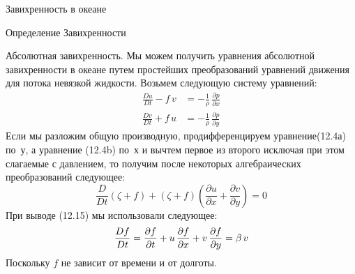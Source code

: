 \begin{chapter}{Завихренность в океане}
\begin{section}{Определение Завихренности}
\begin{paragraph}{Абсолютная завихренность.}
Мы можем получить уравнения абсолютной завихренности в океане путем
простейших преобразований уравнений движения для потока невязкой
жидкости. Возьмем следующую систему уравнений:
\begin{subequations}
\begin{align}
 \frac{Du}{Dt} -f\,v &= -\frac{1}{\rho}\,\frac{\partial{p}}{\partial{x}} \\
 \frac{Dv}{Dt} +f\,u &= -\frac{1}{\rho}\,\frac{\partial{p}}{\partial{y}}
\end{align}
\end{subequations}
Если мы разложим общую производную, продифференцируем уравнение(12.4а)
по~$у$, а уравнение (12.4b) по~$х$ и вычтем первое из второго исключая при
этом слагаемые с давлением, то получим после некоторых алгебраических
преобразований следующее:
\begin{equation}
\boxed{ \frac{D}{Dt}\left(\zeta +f  \right) + \left(\zeta +f  \right)
\left(\frac{\partial{u}}{\partial{x}} +
\frac{\partial{v}}{\partial{y}} \right) = 0 }
\end{equation}
При выводе (12.15) мы использовали следующее:
\begin{equation}
\frac{Df}{Dt} = \frac{\partial{f}}{\partial{t}}
+u\,\frac{\partial{f}}{\partial{x}} +v\,\frac{\partial{f}}{\partial{y}} = \beta
\,v \notag
\end{equation}
Поскольку $f$ не зависит от времени и от долготы.
%
\end{paragraph}


\end{section}
\end{chapter}
